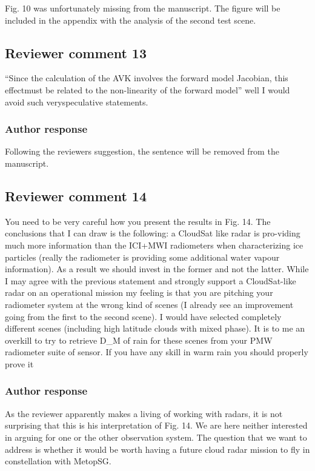 \documentclass[11pt]{scrartcl}
\begin{document}
Fig. 10 was unfortunately missing from the manuscript. The figure will be included in the appendix
with the analysis of the second test scene.


\subsection*{Reviewer comment 13}
 “Since the calculation of the AVK involves the forward model Jacobian, this effectmust be related to the non-linearity of the forward model” well I would avoid such veryspeculative statements.

\subsubsection*{Author response}

Following the reviewers suggestion, the sentence will be removed from the manuscript.

\subsection*{Reviewer comment 14}
You need to be very careful how you present the results in Fig. 14. The
conclusions that I can draw is the following: a CloudSat like radar is
pro-viding much more information than the ICI+MWI radiometers when
characterizing ice particles (really the radiometer is providing some additional
water vapour information). As a result we should invest in the former and not the
latter. While I may agree with the previous statement and strongly support a
CloudSat-like radar on an operational mission my feeling is that you are
pitching your radiometer system at the wrong kind of scenes (I already see an
improvement going from the first to the second scene). I would have selected
completely different scenes (including high latitude clouds with mixed phase). It
is to me an overkill to try to retrieve D\_M of rain for these scenes from your
PMW radiometer suite of sensor. If you have any skill in warm rain you
should properly prove it

\subsubsection*{Author response}

As the reviewer apparently makes a living of working with radars, it is not
surprising that this is his interpretation of Fig. 14. We are here neither
interested in arguing for one or the other observation system. The question
that we want to address is whether it would be worth having a future cloud radar
mission to fly in constellation with MetopSG.
\end{document}
